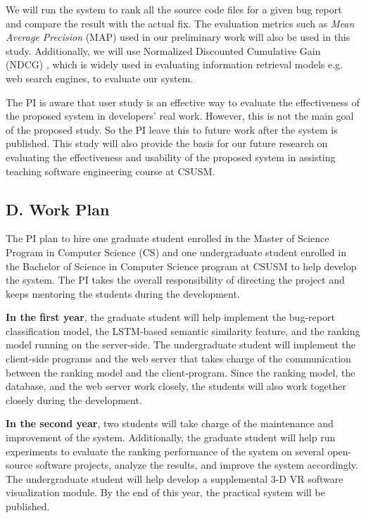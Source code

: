 We will run the system to rank all the source code files for a given bug report and compare the result with the actual fix. The evaluation metrics such as \textit{Mean Average Precision} (MAP) \cite{Manning:2008:IIR:1394399} used in our preliminary work \cite{Ye:TSE15} will also be used in this study. Additionally, we will use Normalized Discounted Cumulative Gain (NDCG) \cite{Jarvelin:2002:CGE:582415.582418}, which is widely used in evaluating information retrieval models e.g. web search engines, to evaluate our system.

The PI is aware that user study is an effective way to evaluate the effectiveness of the proposed system in developers' real work. However, this is not the main goal of the proposed study. So the PI leave this to future work after the system is published. This study will also provide the basis for our future research on evaluating the effectiveness and usability of the proposed system in assisting teaching software engineering course at CSUSM.

\subsection{D. Work Plan}
The PI plan to hire one graduate student enrolled in the Master of Science Program in Computer Science (CS) and one undergraduate student enrolled in the Bachelor of Science in Computer Science program at CSUSM to help develop the system. The PI takes the overall responsibility of directing the project and keeps mentoring the students during the development.

\textbf{In the first year}, the graduate student will help implement the bug-report classification model, the LSTM-based semantic similarity feature, and the ranking model running on the server-side. The undergraduate student will implement the client-side programs and the web server that takes charge of the communication between the ranking model and the client-program. Since the ranking model, the database, and the web server work closely, the students will also work together closely during the development.

\textbf{In the second year}, two students will take charge of the maintenance and improvement of the system. Additionally, the graduate student will help run experiments to evaluate the ranking performance of the system on several open-source software projects, analyze the results, and improve the system accordingly. The undergraduate student will help develop a supplemental 3-D VR software visualization module. By the end of this year, the practical system will be published.

